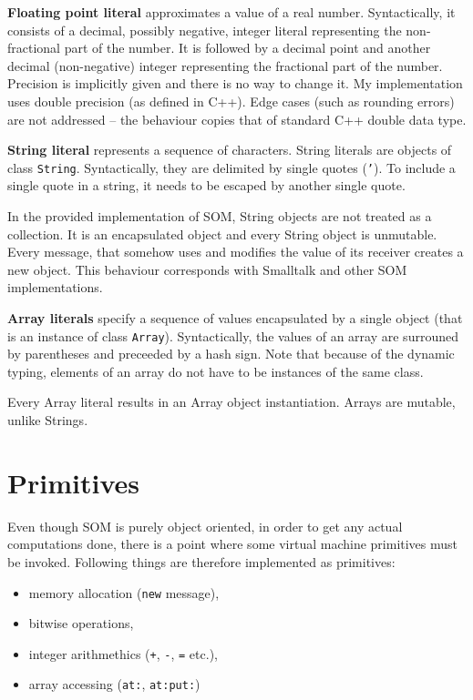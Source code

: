 \documentclass[thesis=M,english]{FITthesis}[2019/12/23]
\begin{document}
\textbf{Floating point literal} approximates a value of a real number. Syntactically, it consists of
a decimal, possibly negative, integer literal representing the non-fractional part of the number. It is
followed by a decimal point and another decimal (non-negative) integer representing the fractional part
of the number. Precision is implicitly given and there is no way to change it. My implementation uses
double precision (as defined in C++). Edge cases (such as rounding errors) are not addressed -- the behaviour
copies that of standard C++ double data type.

\textbf{String literal} represents a sequence of characters. String literals are objects of class \texttt{String}.
Syntactically, they are delimited by single quotes (\texttt{'}). To include a single quote in a string, it needs
to be escaped by another single quote.

In the provided implementation of SOM, String objects are not treated as a collection. It is an encapsulated object
and every String object is unmutable. Every message, that somehow uses and modifies the value of its receiver
creates a new object. This behaviour corresponds with Smalltalk and other SOM implementations.

\textbf{Array literals} specify a sequence of values encapsulated by a single object (that is an instance of class
\texttt{Array}). Syntactically, the values of an array are surrouned by parentheses and preceeded by a hash sign.
Note that because of the dynamic typing, elements of an array do not have to be instances of the same class.

Every Array literal results in an Array object instantiation. Arrays are mutable, unlike Strings.

\section{Primitives}
Even though SOM is purely object oriented, in order to get any actual computations done, there is a point where
some virtual machine primitives must be invoked. Following things are therefore implemented as primitives:
\begin{itemize}
	\item memory allocation (\texttt{new} message),
	\item bitwise operations,
	\item integer arithmethics (\texttt{+}, \texttt{-}, \texttt{=} etc.),
	\item array accessing (\texttt{at:}, \texttt{at:put:})
\end{itemize}
\end{document}
